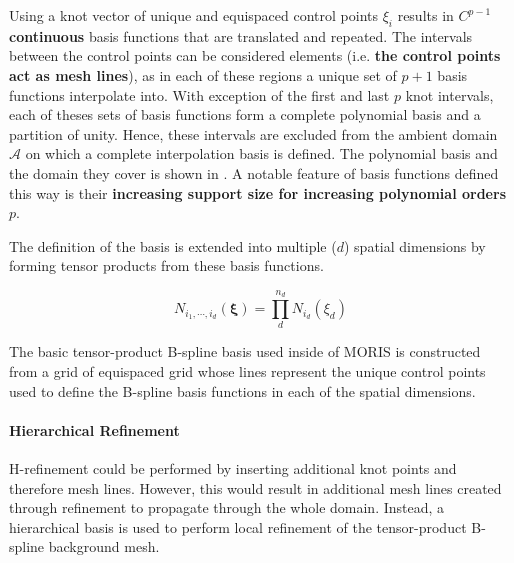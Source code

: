 Using a knot vector of unique and equispaced control points $\xi_i$ results in \textbf{$C^{p-1}$ continuous} basis functions that are translated and repeated. The intervals between the control points can be considered elements (i.e. \textbf{the control points act as mesh lines}), as in each of these regions a unique set of $p+1$ basis functions interpolate into. With exception of the first and last $p$ knot intervals, each of theses sets of basis functions form a complete polynomial basis and a partition of unity. Hence, these intervals are excluded from the ambient domain $\mathcal{A}$ on which a complete interpolation basis is defined. The polynomial basis and the domain they cover is shown in . A notable feature of basis functions defined this way is their \textbf{increasing support size for increasing polynomial orders} $p$.

The definition of the basis is extended into multiple ($d$) spatial dimensions by forming tensor products from these basis functions.

\begin{equation}
\label{eqn:tensor_product}
    N_{i_1, \cdots, i_d}(\bm{\xi}) = \prod_{d}^{n_d}N_{i_d}(\xi_d)
\end{equation}

The basic tensor-product B-spline basis used inside of MORIS is constructed from a grid of equispaced grid whose lines represent the unique control points used to define the B-spline basis functions in each of the spatial dimensions.

\paragraph{Hierarchical Refinement}
\hypertarget{hierarchical_refinement}{}

H-refinement could be performed by inserting additional knot points and therefore mesh lines. However, this would result in additional mesh lines created through refinement to propagate through the whole domain.
Instead, a hierarchical basis is used to perform local refinement of the tensor-product B-spline background mesh.

